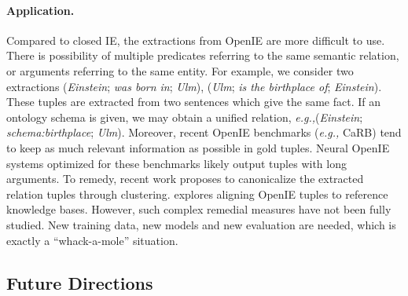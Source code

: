 \documentclass{article}
\newcommand{\eg}{\emph{e.g.,}\xspace}
\begin{document}
\paragraph{Application.}
Compared to closed IE, the extractions from OpenIE are more difficult to use. There is possibility of multiple predicates referring to the same semantic relation, or arguments referring to the same entity. For example, we consider two extractions (\textit{Einstein}; \textit{was born in}; \textit{Ulm}), (\textit{Ulm}; \textit{is the birthplace of}; \textit{Einstein}). These tuples are extracted from two sentences which give the same fact. If an ontology schema is given, we may obtain a unified relation, \eg (\textit{Einstein}; \textit{schema:birthplace}; \textit{Ulm}). Moreover, recent OpenIE benchmarks (\eg CaRB) tend to keep as much relevant information as possible in gold tuples. Neural OpenIE systems optimized for these benchmarks likely output  tuples with long arguments. To remedy, recent work \cite{Wu2018TowardsPO} \cite{Vashishth2018CESICO} \cite{Pal2020CoClusteringTF} proposes to canonicalize the extracted relation tuples through clustering. \cite{gashteovski-etal-2020-aligning} explores aligning OpenIE tuples to reference knowledge bases. However, such complex remedial measures have not been fully studied. New training data, new models and new evaluation are needed, which is 
exactly a ``whack-a-mole'' situation.

\subsection{Future Directions}
\end{document}
